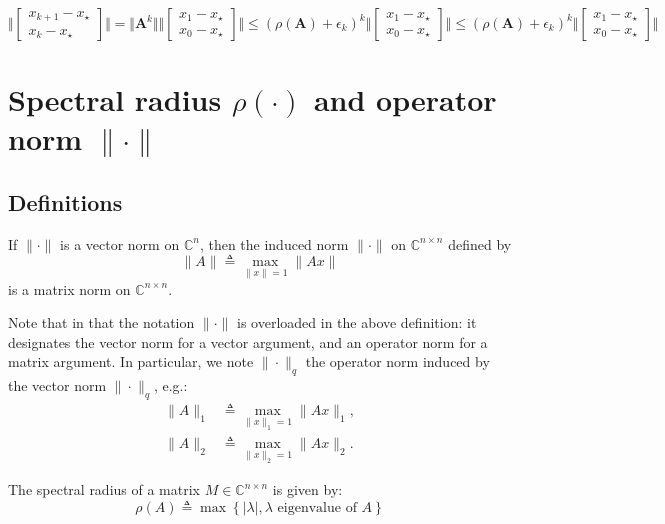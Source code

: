 \documentclass{article}
\begin{document}
$
\Vert \begin{bmatrix}
x_{k+1}-x_\star \\
x_{k}-x_\star
\end{bmatrix}
\Vert
=\Vert \mathbf{A}^k \Vert
\Vert \begin{bmatrix}
x_{1}-x_\star \\
x_{0}-x_\star
\end{bmatrix}
\Vert \le (\rho(\mathbf{A}) +\epsilon_k)^k \Vert \begin{bmatrix}
x_{1}-x_\star \\
x_{0}-x_\star
\end{bmatrix}
\Vert \le (\rho(\mathbf{A})+\epsilon_k)^k \Vert \begin{bmatrix}
x_{1}-x_\star \\
x_{0}-x_\star
\end{bmatrix}
\Vert  
$\\
\pagebreak

\appendix
%
\section{Spectral radius $\rho(\cdot)$ and operator norm $\| \cdot \|$}
\label{sec:matrix_norm_and_spectral_radius}
\subsection*{Definitions}
\begin{defn}
If $\| \cdot \|$ is a vector norm on $\mathds{C}^n$, then the induced norm $\| \cdot \|$ on $\mathds{C}^{n\times n}$ defined by
\[
	\|A\| \triangleq \max_{\|x\|=1}\|Ax\|
\]
is a matrix norm on $\mathds{C}^{n\times n}$. 
\end{defn} 
\par Note that in that the notation $\| \cdot \|$ is overloaded in the above definition: it designates the vector norm for a vector argument, and an operator norm for a matrix argument. In particular, we note $\| \cdot \|_q$ the operator norm induced by the vector norm $\| \cdot \|_q$, e.g.:
\begin{align}
	\|A\|_1 &\triangleq \max_{\|x\|_1=1}\|Ax\|_1, \nonumber \\
	\|A\|_2 &\triangleq \max_{\|x\|_2=1}\|Ax\|_2. \nonumber
\end{align}

\begin{defn}
The spectral radius of a matrix $M\in \mathds{C}^{n\times n}$ is given by:
\[
	\rho(A) \triangleq \max \left\{ |\lambda|, \lambda \text{ eigenvalue of }A\right\}
\]
\end{defn}
\end{document}
